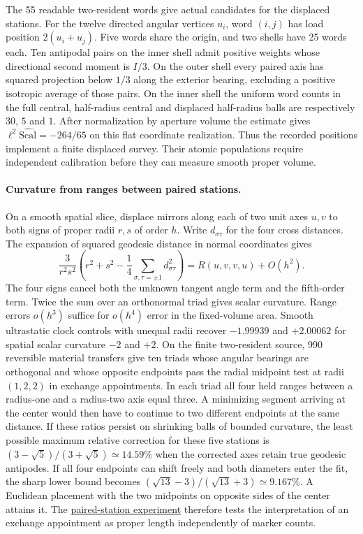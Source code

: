 \documentclass[11pt]{article}
\begin{document}
The 55 readable two-resident words give actual candidates for the
displaced stations. For the twelve directed angular vertices $u_i$,
word $(i,j)$ has load position $2(u_i+u_j)$. Five words share the origin, and two
shells have 25 words each. Ten antipodal pairs on the inner shell
admit positive weights whose directional second moment is $I/3$.
On the outer shell every paired axis has squared projection below
$1/3$ along the exterior bearing, excluding a positive isotropic
average of those pairs. On the inner shell the
uniform word counts in the full central, half-radius central and
displaced half-radius balls are respectively $30$, $5$ and $1$.
After normalization by aperture volume the estimate gives
$\ell^2\widehat{\mathrm{Scal}}=-264/65$ on this flat coordinate
realization. Thus the recorded positions implement a finite displaced
survey. Their atomic populations require independent calibration
before they can measure smooth proper volume.

\paragraph{Curvature from ranges between paired stations.}
On a smooth spatial slice, displace mirrors along each of two unit
axes $u,v$ to both signs of proper radii $r,s$ of order $h$. Write
$d_{\sigma\tau}$ for the four cross distances. The expansion of
squared geodesic distance in normal coordinates gives
\[
 \frac{3}{r^2s^2}\left(r^2+s^2-
 \frac14\sum_{\sigma,\tau=\pm1}d_{\sigma\tau}^2\right)
 =R(u,v,v,u)+O(h^2).
\]
The four signs cancel both the unknown tangent angle term and the
fifth-order term. Twice the sum over an orthonormal triad gives scalar
curvature. Range errors $o(h^3)$ suffice for $o(h^4)$ error in the
fixed-volume area. Smooth ultrastatic clock controls with unequal
radii recover $-1.99939$ and $+2.00062$ for spatial scalar curvature
$-2$ and $+2$. On the finite two-resident source, 990 reversible
material transfers give ten triads whose angular bearings are
orthogonal and whose opposite endpoints pass the radial midpoint
test at radii $(1,2,2)$ in exchange appointments. In each triad all
four held ranges between a radius-one and a radius-two axis equal
three. A minimizing segment arriving at the center would then have
to continue to two different endpoints at the same distance. If
these ratios persist on shrinking balls of bounded curvature, the
least possible maximum relative correction for these five stations
is $(3-\sqrt{5})/(3+\sqrt{5})\simeq14.59\%$ when the corrected
axes retain true geodesic antipodes. If all four endpoints can shift
freely and both diameters enter the fit, the sharp lower bound becomes
$(\sqrt{13}-3)/(\sqrt{13}+3)\simeq9.167\%$. A Euclidean placement
with the two midpoints on opposite sides of the center attains it.
The \href{https://github.com/FloatingPragma/observer-patch-holography/tree/main/code/matched_einstein_limit/fixed_volume/polarized_ranges}{paired-station experiment}
therefore tests the interpretation of an exchange appointment as
proper length independently of marker counts.
\end{document}
